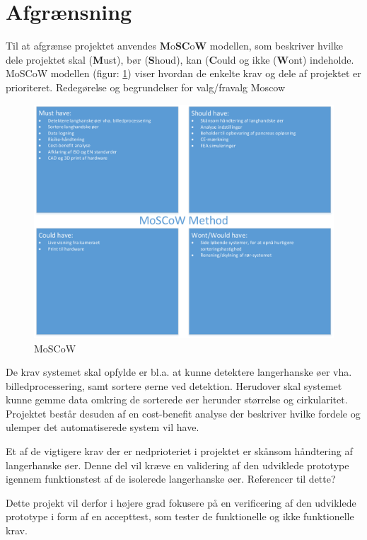 \section{Afgrænsning}
Til at afgrænse projektet anvendes \textbf{M}o\textbf{SC}o\textbf{W} modellen, som beskriver hvilke dele projektet skal (\textbf{M}ust), bør (\textbf{S}houd), kan (\textbf{C}ould og ikke (\textbf{W}ont) indeholde. MoSCoW modellen (figur: \ref{fig:moscow}) viser hvordan de enkelte krav og dele af projektet er prioriteret. 
Redegørelse og begrundelser for valg/fravalg
Moscow

\begin{figure}[H]
	\centering
	\includegraphics[width=1\textwidth]{billeder/MoSCoW-crop.pdf}
	\caption{MoSCoW}
	\label{fig:moscow}
\end{figure}

De krav systemet skal opfylde er bl.a. at kunne detektere langerhanske øer vha. billedprocessering, samt sortere øerne ved detektion. Herudover skal systemet kunne gemme data omkring de sorterede øer herunder størrelse og cirkularitet. Projektet består desuden af en cost-benefit analyse der beskriver hvilke fordele og ulemper det automatiserede system vil have. 

Et af de vigtigere krav der er nedprioteriet i projektet er skånsom håndtering af langerhanske øer. Denne del vil kræve en validering af den udviklede prototype igennem funktionstest af de isolerede langerhanske øer. Referencer til dette?

Dette projekt vil derfor i højere grad fokusere på en verificering af den udviklede prototype i form af en accepttest, som tester de funktionelle og ikke funktionelle krav.

